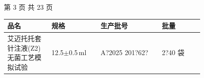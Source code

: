 \documentclass[UTF8,10pt,a4paper,fontset=fandol]{ctexart}
\newcommand{\fieldvalue}[1]{#1}
\newcommand{\handwritten}[1]{#1}
\begin{document}
\begin{center}
第 3 页 共 23 页
\end{center}

\newpage

\begin{center}
\begin{tabular}{|p{0.18\linewidth}|p{0.20\linewidth}|p{0.25\linewidth}|p{0.17\linewidth}|}
\hline
品名 & 规格 & 生产批号 & 批量\\
\hline
艾迈托托套针注液(Z2)无菌工艺模拟试验 & 12.5$\pm$0.5\,ml &
\fieldvalue{\handwritten{A?2025 201?62?}} &
\fieldvalue{\handwritten{2?40}} 袋\\
\hline
\end{tabular}
\end{center}

\vspace{0.5em}
\end{document}
